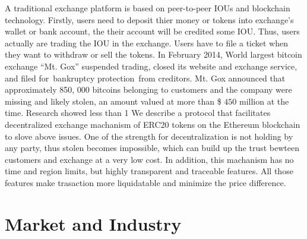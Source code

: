 \documentclass[UTF8,nofonts]{article}
\begin{document}
A traditional exchange platform is based on peer-to-peer IOUs and blockchain technology. Firstly,  users need to deposit thier money or tokens into exchange’s wallet or bank account,  the their account will be credited some IOU. Thus,  users actually are trading the IOU in the exchange. Users have to file a ticket when they want to withdraw or sell the tokens.
In February 2014,  World largest bitcoin exchange “Mt. Gox” suspended trading,  closed its website and exchange service,  and filed for bankruptcy protection from creditors\cite{mcmillan2014inside}. Mt. Gox announced that approximately 850, 000 bitcoins belonging to customers and the company were missing and likely stolen,  an amount valued at more than \$ $450$ million at the time. Research showed less than 1%
We describe a protocol that facilitates decentralized exchange machanism of ERC20 tokens on the Ethereum blockchain to slove above issues. One of the strength for decentralization is not holding by any party,  thus stolen becomes impossible, which can build up the trust bewteen customers and exchange at a very low cost. In addition, this machanism has no time and region limits, but highly transparent and traceable features. All those features make trasaction more liquidatable and minimize the price difference.

\section{Market and Industry\label{sec: existingworks}}
\end{document}
